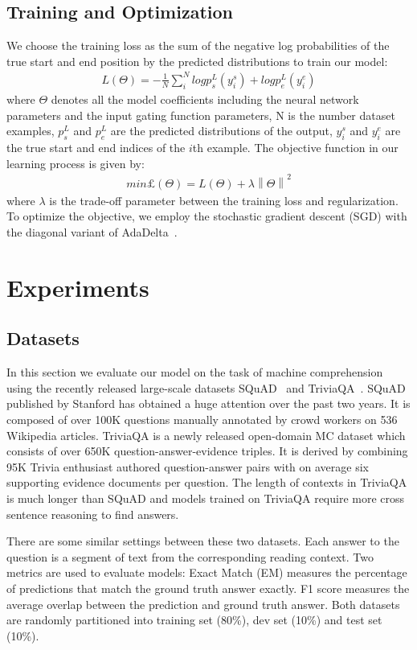 \documentclass[letterpaper]{article} \usepackage{aaai18}  \usepackage{times}  \usepackage{helvet}  \usepackage{courier}  \usepackage{url}  \usepackage{graphicx}  \usepackage{booktabs}
\begin{document}
\subsection{Training and Optimization}
We choose the training loss as the sum of the negative log probabilities of the true start and end position by the predicted distributions to train our model:
\begin{align}
L(\Theta)=-\frac{1}{N}\sum_{i}^{N}logp_s^L(y_i^s)+logp_e^L(y_i^e) \tag{12}
\end{align}
where $\Theta$ denotes all the model coefficients including the neural network parameters and the input gating function parameters, N is the number dataset examples, $p_s^L$ and $p_e^L$ are the predicted distributions of the output, $y_i^s$ and $y_i^e$ are the true start and end indices of the $i$th example. The objective function in our learning process is given by:
\begin{align}
min\pounds  (\Theta)=L(\Theta)+\lambda \left \| \Theta \right \|^2 \tag{13}
\end{align}
where $\lambda$ is the trade-off parameter between the training loss and regularization. To optimize the objective, we employ the stochastic gradient descent (SGD) with the diagonal variant of AdaDelta~\cite{Zeiler2012ADADELTA}.

 \section{Experiments}
 \subsection{Datasets}
 In this section we evaluate our model on the task of machine comprehension using the recently released large-scale datasets SQuAD~\cite{rajpurkar2016squad} and TriviaQA~\cite{Joshi2017TriviaQAAL}. SQuAD published by Stanford has obtained a huge attention over the past two years. It is composed of over 100K questions manually annotated by crowd workers on 536 Wikipedia articles. TriviaQA is a newly released open-domain MC dataset which consists of over 650K question-answer-evidence triples. It is derived by combining 95K Trivia enthusiast authored question-answer pairs with on average six supporting evidence documents per question. The length of contexts in TriviaQA is much longer than SQuAD and models trained on TriviaQA require more cross sentence reasoning to find answers. 
 
 There are some similar settings between these two datasets. Each answer to the question is a segment of text from the corresponding reading context. Two metrics are used to evaluate models: Exact Match (EM) measures the percentage of predictions that match the ground truth answer exactly. F1 score measures the average overlap between the prediction and ground truth answer. Both datasets are randomly partitioned into training set (80\%), dev set (10\%) and test set (10\%). 
 
\end{document}
